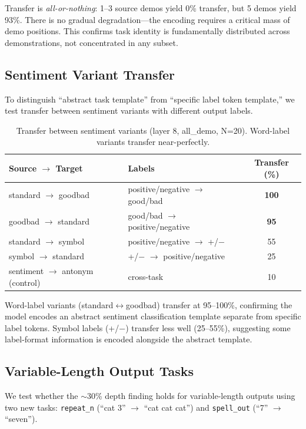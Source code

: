 \documentclass[sigconf,anonymous]{acmart}
\begin{document}
Transfer is \emph{all-or-nothing}: 1--3 source demos yield 0\% transfer, but 5 demos yield 93\%. There is no gradual degradation---the encoding requires a critical mass of demo positions. This confirms task identity is fundamentally distributed across demonstrations, not concentrated in any subset.

\subsection{Sentiment Variant Transfer}

To distinguish ``abstract task template'' from ``specific label token template,'' we test transfer between sentiment variants with different output labels.

\begin{table}[h]
\centering
\small
\caption{Transfer between sentiment variants (layer 8, all\_demo, N=20). Word-label variants transfer near-perfectly.}
\label{tab:sentiment_variants}
\begin{tabular}{@{}llc@{}}
\toprule
Source $\to$ Target & Labels & Transfer (\%) \\
\midrule
standard $\to$ goodbad & positive/negative $\to$ good/bad & \textbf{100} \\
goodbad $\to$ standard & good/bad $\to$ positive/negative & \textbf{95} \\
standard $\to$ symbol & positive/negative $\to$ +/$-$ & 55 \\
symbol $\to$ standard & +/$-$ $\to$ positive/negative & 25 \\
\midrule
sentiment $\to$ antonym (control) & cross-task & 10 \\
\bottomrule
\end{tabular}
\end{table}

Word-label variants (standard$\leftrightarrow$goodbad) transfer at 95--100\%, confirming the model encodes an abstract sentiment classification template separate from specific label tokens. Symbol labels (+/$-$) transfer less well (25--55\%), suggesting some label-format information is encoded alongside the abstract template.

\subsection{Variable-Length Output Tasks}

We test whether the $\sim$30\% depth finding holds for variable-length outputs using two new tasks: \texttt{repeat\_n} (``cat 3'' $\to$ ``cat cat cat'') and \texttt{spell\_out} (``7'' $\to$ ``seven'').
\end{document}
